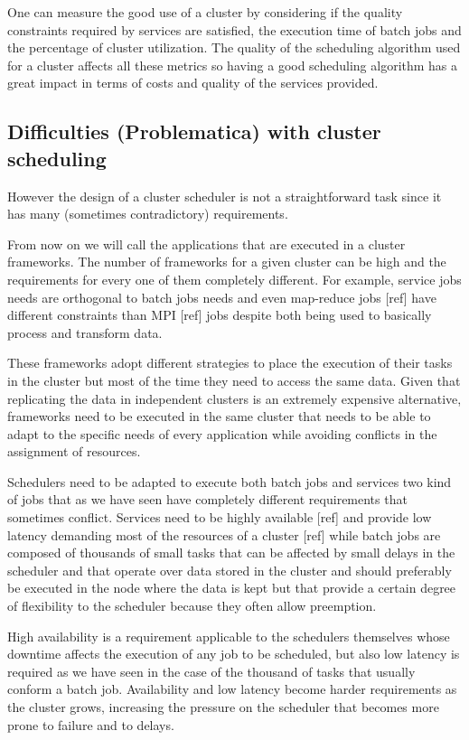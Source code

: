\documentclass{svjour3}                     %
\begin{document}
One can measure the good use of a cluster by considering if the
quality constraints required by services are satisfied, the execution
time of batch jobs and the percentage of cluster utilization. The
quality of the scheduling algorithm used for a cluster affects all
these metrics so having a good scheduling algorithm has a great
impact in terms of costs and quality of the services provided.

\subsection{Difficulties (Problematica) with cluster scheduling}

However the design of a cluster scheduler is not a straightforward
task since it has many (sometimes contradictory) requirements.

From now on we will call the applications that are executed in a cluster frameworks.
The number of frameworks for a given cluster can be high and the
requirements for every one of them completely different. For example,
service jobs needs are orthogonal to batch jobs needs and even
map-reduce jobs [ref] have different constraints than MPI [ref]
jobs despite both being used to basically process and transform
data.

These frameworks adopt different strategies to place the
execution of their tasks in the cluster but most of the
time they need to access the same data. Given that replicating the
data in independent clusters is an extremely expensive alternative, frameworks
need to be executed in the same cluster that needs to be able to adapt
to the specific needs of every application while avoiding conflicts in
the assignment of resources.

Schedulers need to be adapted to execute both batch jobs and services
two kind of jobs that as we have seen have completely different
requirements that sometimes conflict. Services need to be highly
available [ref] and provide low latency demanding most of the
resources of a cluster [ref] while batch jobs are composed of thousands of small
tasks that can be affected by small delays in the scheduler and that
operate over data stored in the cluster and should
preferably be executed in the node where the data is kept but that
provide a certain degree of flexibility to the scheduler because they
often allow preemption.

High availability is a requirement applicable to the schedulers
themselves whose downtime affects the execution of any job to be
scheduled, but also low latency is required as we have seen in the
case of the thousand of tasks that usually conform a batch
job. Availability and low latency become harder requirements as the
cluster grows, increasing the pressure on the scheduler that becomes
more prone to failure and to delays.
\end{document}
